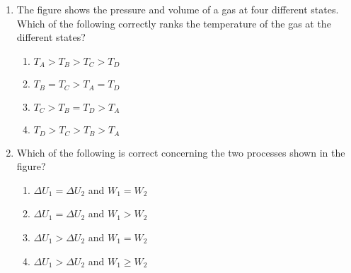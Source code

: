 \documentclass{../../../oss-apphys}
\begin{document}
\begin{multicols}{2}
\begin{enumerate}[leftmargin=18pt,start=3]
  \item The figure shows the pressure and volume of a gas at four different
    states. Which of the following correctly ranks the temperature of the gas
    at the different states?
    \begin{center}
      \vspace{-.15in}
    \end{center}
    \begin{enumerate}[noitemsep,topsep=0pt,leftmargin=18pt,label=(\Alph*)]
    \item $T_A>T_B>T_C>T_D$
    \item $T_B=T_C>T_A=T_D$
    \item $T_C>T_B=T_D>T_A$
    \item $T_D>T_C>T_B>T_A$
    \end{enumerate}

    \columnbreak
    
  \item Which of the following is correct concerning the two processes shown
    in the figure?
    \begin{center}
      \vspace{-.15in}
    \end{center}
    \begin{enumerate}[noitemsep,topsep=0pt,leftmargin=18pt,label=(\Alph*)]
    \item $\Delta U_1 = \Delta U_2$ and $W_1= W_2$
    \item $\Delta U_1 = \Delta U_2$ and $W_1>W_2$
    \item $\Delta U_1 > \Delta U_2$ and $W_1=W_2$
    \item $\Delta U_1 > \Delta U_2$ and $W_1\geq W_2$
    \end{enumerate}
  

\end{enumerate}
\end{multicols}
\end{document}
